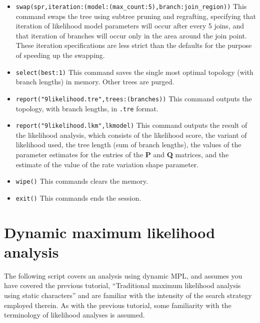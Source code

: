 \begin{itemize}
\item \texttt{swap(spr,iteration:(model:(max\_count:5),branch:join\_region))} This command swaps the tree using subtree pruning and regrafting, specifying that iteration of likelihood model parameters will occur after every 5 joins, and that iteration of branches will occur only in the area around the join point. These iteration specifications are less strict than the defaults for the purpose of speeding up the swapping.
\item \texttt{select(best:1)} This command saves the single most optimal topology (with branch lengths) in memory. Other trees are purged.
\item \texttt{report("9likelihood.tre",trees:(branches))} This command outputs the topology, with branch lengths, in \texttt{.tre} format.
\item \texttt{report("9likelihood.lkm",lkmodel)} This command outputs the result of the likelihood analysis, which consists of the likelihood score, the variant of likelihood used, the tree length (sum of branch lengths), the values of the parameter estimates for the entries of the \textbf{P} and \textbf{Q} matrices, and the estimate of the value of the rate variation shape parameter.
\item \texttt{wipe()} This commands clears the memory.
\item \texttt{exit()} This commands ends the \poy session.
\end{itemize}

\section{Dynamic maximum likelihood analysis}{\label{tutorial11}}
The following script covers an analysis using dynamic MPL, and assumes you have covered the previous tutorial, ``Traditional maximum likelihood analysis using static characters'' and are familiar with the intensity of the search strategy employed therein. As with the previous tutorial, some familiarity with the terminology of likelihood analyses is assumed.

